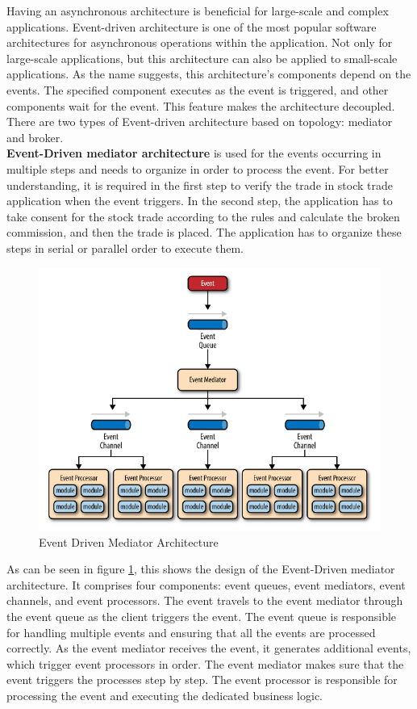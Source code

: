 \documentclass[12pt,a4paper]{article}
\begin{document}
Having an asynchronous architecture is beneficial for large-scale and complex applications. Event-driven architecture is one of the most popular software architectures for asynchronous operations within the application. Not only for large-scale applications, but this architecture can also be applied to small-scale applications. As the name suggests, this architecture's components depend on the events. The specified component executes as the event is triggered, and other components wait for the event. This feature makes the architecture decoupled. There are two types of Event-driven architecture based on topology: mediator and broker. \cite{r18} \\

\textbf{Event-Driven mediator architecture} is used for the events occurring in multiple steps and needs to organize in order to process the event. For better understanding, it is required in the first step to verify the trade in stock trade application when the event triggers. In the second step, the application has to take consent for the stock trade according to the rules and calculate the broken commission, and then the trade is placed. The application has to organize these steps in serial or parallel order to execute them. \cite{r18}

\begin{figure}[H]
\centering
\includegraphics[scale=0.75]{event_driven.PNG}
\caption{Event Driven Mediator Architecture \cite{r18}}
\label{event_driven}
\end{figure}

As can be seen in figure \ref{event_driven}, this shows the design of the Event-Driven mediator architecture. It comprises four components: event queues, event mediators, event channels, and event processors. The event travels to the event mediator through the event queue as the client triggers the event. The event queue is responsible for handling multiple events and ensuring that all the events are processed correctly. As the event mediator receives the event, it generates additional events, which trigger event processors in order. The event mediator makes sure that the event triggers the processes step by step. The event processor is responsible for processing the event and executing the dedicated business logic. \cite{r18} \\
\end{document}
